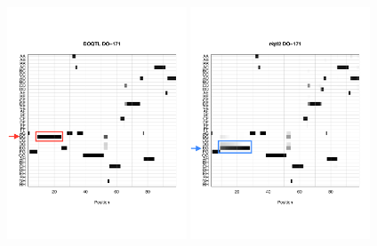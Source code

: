 \documentclass[12pt,t]{beamer}
\begin{document}
		\begin{frame}
			\begin{figure}
				\vspace{-0.1in}
				{\includegraphics[height=3.7in, width=2.1in]{figures/uni_probs_heat_171_doqtl_markup1.pdf}} 
				{\includegraphics[height=3.7in, width=2.1in]{figures/uni_probs_heat_171_rqtl2_markup1.pdf}}
			\end{figure}		
		\end{frame}
		
\end{document}
